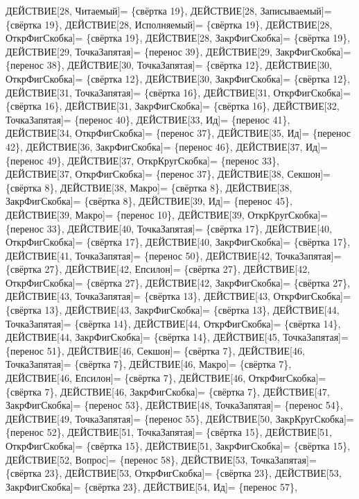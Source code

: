 \documentclass[a0]{a0poster}
\begin{document}
ДЕЙСТВИЕ[28, Читаемый]= \{свёртка 19\}, ДЕЙСТВИЕ[28, Записываемый]= \{свёртка 19\}, ДЕЙСТВИЕ[28, Исполняемый]= \{свёртка 19\}, ДЕЙСТВИЕ[28, ОткрФигСкобка]= \{свёртка 19\}, ДЕЙСТВИЕ[28, ЗакрФигСкобка]= \{свёртка 19\}, ДЕЙСТВИЕ[29, ТочкаЗапятая]= \{перенос 39\}, ДЕЙСТВИЕ[29, ЗакрФигСкобка]= \{перенос 38\}, ДЕЙСТВИЕ[30, ТочкаЗапятая]= \{свёртка 12\}, ДЕЙСТВИЕ[30, ОткрФигСкобка]= \{свёртка 12\}, ДЕЙСТВИЕ[30, ЗакрФигСкобка]= \{свёртка 12\}, ДЕЙСТВИЕ[31, ТочкаЗапятая]= \{свёртка 16\}, ДЕЙСТВИЕ[31, ОткрФигСкобка]= \{свёртка 16\}, ДЕЙСТВИЕ[31, ЗакрФигСкобка]= \{свёртка 16\}, ДЕЙСТВИЕ[32, ТочкаЗапятая]= \{перенос 40\}, ДЕЙСТВИЕ[33, Ид]= \{перенос 41\}, ДЕЙСТВИЕ[34, ОткрФигСкобка]= \{перенос 37\}, ДЕЙСТВИЕ[35, Ид]= \{перенос 42\}, ДЕЙСТВИЕ[36, ЗакрФигСкобка]= \{перенос 46\}, ДЕЙСТВИЕ[37, Ид]= \{перенос 49\}, ДЕЙСТВИЕ[37, ОткрКругСкобка]= \{перенос 33\}, \\
ДЕЙСТВИЕ[37, ОткрФигСкобка]= \{перенос 37\}, ДЕЙСТВИЕ[38, Секшон]= \{свёртка 8\}, ДЕЙСТВИЕ[38, Макро]= \{свёртка 8\}, ДЕЙСТВИЕ[38, ЗакрФигСкобка]= \{свёртка 8\}, ДЕЙСТВИЕ[39, Ид]= \{перенос 45\}, ДЕЙСТВИЕ[39, Макро]= \{перенос 10\}, ДЕЙСТВИЕ[39, ОткрКругСкобка]= \{перенос 33\}, ДЕЙСТВИЕ[40, ТочкаЗапятая]= \{свёртка 17\}, ДЕЙСТВИЕ[40, ОткрФигСкобка]= \{свёртка 17\}, ДЕЙСТВИЕ[40, ЗакрФигСкобка]= \{свёртка 17\}, ДЕЙСТВИЕ[41, ТочкаЗапятая]= \{перенос 50\}, ДЕЙСТВИЕ[42, ТочкаЗапятая]= \{свёртка 27\}, ДЕЙСТВИЕ[42, Епсилон]= \{свёртка 27\}, ДЕЙСТВИЕ[42, ОткрФигСкобка]= \{свёртка 27\}, ДЕЙСТВИЕ[42, ЗакрФигСкобка]= \{свёртка 27\}, ДЕЙСТВИЕ[43, ТочкаЗапятая]= \{свёртка 13\}, ДЕЙСТВИЕ[43, ОткрФигСкобка]= \{свёртка 13\}, ДЕЙСТВИЕ[43, ЗакрФигСкобка]= \{свёртка 13\}, ДЕЙСТВИЕ[44, ТочкаЗапятая]= \{свёртка 14\}, ДЕЙСТВИЕ[44, ОткрФигСкобка]= \{свёртка 14\}, \\
ДЕЙСТВИЕ[44, ЗакрФигСкобка]= \{свёртка 14\}, ДЕЙСТВИЕ[45, ТочкаЗапятая]= \{перенос 51\}, ДЕЙСТВИЕ[46, Секшон]= \{свёртка 7\}, ДЕЙСТВИЕ[46, ТочкаЗапятая]= \{свёртка 7\}, ДЕЙСТВИЕ[46, Макро]= \{свёртка 7\}, ДЕЙСТВИЕ[46, Епсилон]= \{свёртка 7\}, ДЕЙСТВИЕ[46, ОткрФигСкобка]= \{свёртка 7\}, ДЕЙСТВИЕ[46, ЗакрФигСкобка]= \{свёртка 7\}, ДЕЙСТВИЕ[47, ЗакрФигСкобка]= \{перенос 53\}, ДЕЙСТВИЕ[48, ТочкаЗапятая]= \{перенос 54\}, ДЕЙСТВИЕ[49, ТочкаЗапятая]= \{перенос 55\}, ДЕЙСТВИЕ[50, ЗакрКругСкобка]= \{перенос 52\}, ДЕЙСТВИЕ[51, ТочкаЗапятая]= \{свёртка 15\}, ДЕЙСТВИЕ[51, ОткрФигСкобка]= \{свёртка 15\}, ДЕЙСТВИЕ[51, ЗакрФигСкобка]= \{свёртка 15\}, ДЕЙСТВИЕ[52, Вопрос]= \{перенос 58\}, ДЕЙСТВИЕ[53, ТочкаЗапятая]= \{свёртка 23\}, ДЕЙСТВИЕ[53, ОткрФигСкобка]= \{свёртка 23\}, ДЕЙСТВИЕ[53, ЗакрФигСкобка]= \{свёртка 23\}, ДЕЙСТВИЕ[54, Ид]= \{перенос 57\}, \\
\end{document}
